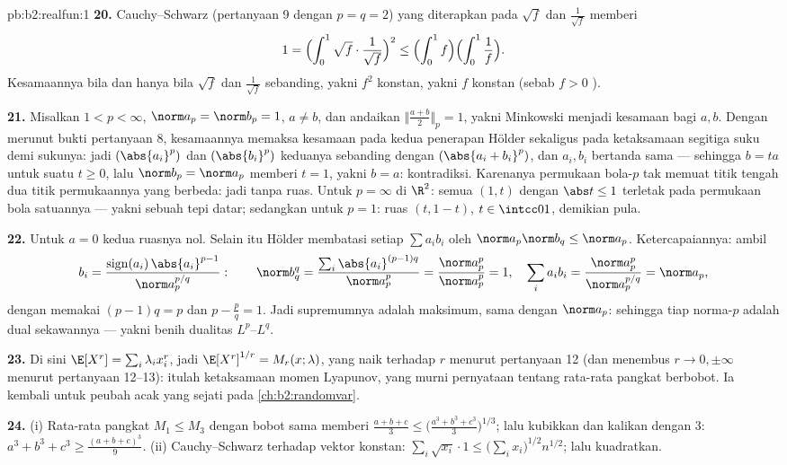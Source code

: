 \begin{solution}{pb:b2:realfun:1}
\textbf{20.} Cauchy--Schwarz (pertanyaan 9 dengan $p = q = 2$) yang
diterapkan pada $\sqrt f$ dan $\frac1{\sqrt f}$ memberi
\[
1 = \Bigl(\int_0^1\sqrt f\cdot\frac{1}{\sqrt f}\Bigr)^{2}
\leq \Bigl(\int_0^1 f\Bigr)\Bigl(\int_0^1\frac1f\Bigr).
\]
Kesamaannya bila dan hanya bila $\sqrt f$ dan $\frac1{\sqrt f}$
sebanding, yakni $f^2$ konstan, yakni $f$ konstan (sebab $f > 0$ ).

\textbf{21.} Misalkan $1 < p < \infty$, $\norm a_p = \norm b_p = 1$,
$a \neq b$, dan andaikan $\bigl\Vert\frac{a+b}2\bigr\Vert_p = 1$,
yakni Minkowski menjadi kesamaan bagi $a, b$. Dengan merunut
bukti pertanyaan 8, kesamaannya memaksa kesamaan pada kedua penerapan
Hölder sekaligus pada ketaksamaan segitiga suku demi sukunya: jadi
$(\abs{a_i}^p)$ dan $(\abs{b_i}^p)$ keduanya sebanding dengan
$(\abs{a_i + b_i}^p)$, dan $a_i, b_i$ bertanda sama --- sehingga $b = ta$
untuk suatu $t \geq 0$, lalu $\norm b_p = \norm a_p$ memberi $t = 1$,
yakni $b = a$: kontradiksi. Karenanya permukaan bola-$p$ tak memuat
titik tengah dua titik permukaannya yang berbeda: jadi tanpa ruas.
Untuk $p = \infty$ di $\R^2$: semua $(1, t)$ dengan $\abs t \leq 1$
terletak pada permukaan bola satuannya --- yakni sebuah tepi datar;
sedangkan untuk $p = 1$: ruas $(t, 1 - t)$, $t \in \intcc01$, demikian pula.

\textbf{22.} Untuk $a = 0$ kedua ruasnya nol. Selain itu Hölder
membatasi setiap $\sum a_ib_i$ oleh $\norm a_p\norm b_q \leq \norm
a_p$. Ketercapaiannya: ambil
\[
b_i = \frac{\operatorname{sign}(a_i)\,\abs{a_i}^{p-1}}
{\norm a_p^{p/q}} :
\qquad
\norm b_q^q = \frac{\sum_i\abs{a_i}^{(p-1)q}}{\norm a_p^{p}}
= \frac{\norm a_p^p}{\norm a_p^p} = 1,
\quad
\sum_ia_ib_i = \frac{\norm a_p^p}{\norm a_p^{p/q}} =
\norm a_p ,
\]
dengan memakai $(p-1)q = p$ dan $p - \frac pq = 1$. Jadi supremumnya
adalah maksimum, sama dengan $\norm a_p$: sehingga tiap norma-$p$ adalah
 dual sekawannya --- yakni benih dualitas $L^p$--$L^q$.

\textbf{23.} Di sini $\E[X^r] = \sum_i\lambda_ix_i^r$, jadi
$\E[X^r]^{1/r} = M_r(x; \lambda)$, yang naik terhadap $r$ menurut
pertanyaan 12 (dan menembus $r \to 0, \pm\infty$ menurut pertanyaan
12--13): itulah ketaksamaan momen Lyapunov, yang murni pernyataan
tentang rata-rata pangkat berbobot. Ia kembali untuk peubah acak yang
sejati pada \cref{ch:b2:randomvar}.

\textbf{24.} (i) Rata-rata pangkat $M_1 \leq M_3$ dengan bobot sama
memberi $\frac{a+b+c}3 \leq \bigl(\frac{a^3+b^3+c^3}3\bigr)^{1/3}$;
lalu kubikkan dan kalikan dengan $3$: $a^3 + b^3 + c^3 \geq
\frac{(a+b+c)^3}9$. (ii) Cauchy--Schwarz terhadap vektor
konstan: $\sum_i\sqrt{x_i}\cdot1 \leq
\bigl(\sum_ix_i\bigr)^{1/2}n^{1/2}$; lalu kuadratkan.


\end{solution}
